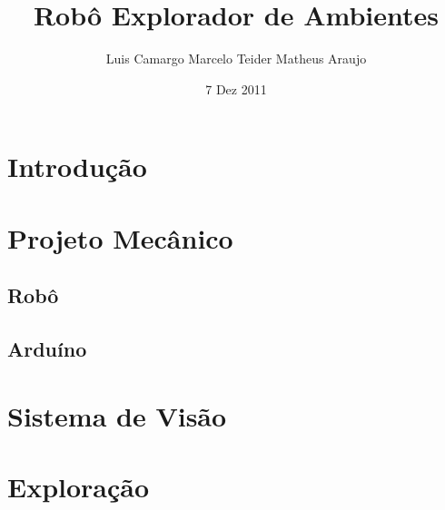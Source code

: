 \documentclass{beamer}
\begin{document}
	\title{Robô Explorador de Ambientes}
	\author{Luis Camargo \newline Marcelo Teider \newline Matheus Araujo}

	\date{7 Dez 2011}

	\frame{\titlepage}

	\section{Introdução}
	
	
	\section{Projeto Mecânico}


		\subsection{Robô}


		\subsection{Arduíno}



	\section{Sistema de Visão}

	\section{Exploração}
\end{document}

